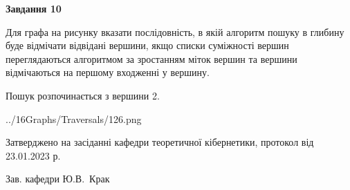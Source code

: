 \documentclass[12pt, ukrainian]{article}
\begin{document}
{\begin {large}
{\begin {center}\textbf{Завдання 10}\end {center}}\par
Для графа на рисунку вказати послідовність, в якій алгоритм пошуку в глибину буде відмічати відвідані вершини, якщо списки суміжності вершин переглядаються алгоритмом за зростанням міток вершин та вершини відмічаються на першому вход\-женні у вершину.\par
Пошук розпочинається з вершини 2.\par

\begin{center}
	{../16Graphs/Traversals/126.png}
\end{center}\par
\newpage


\end {large}
}
{\smallskip \begin {small} Затверджено на засіданні кафедри теоретичної кібернетики, протокол  від   23.01.2023 р.\par\smallskip\smallskip
{\parbox {6.5 cm}{Зав. кафедри \dotfill Ю.В.~Крак}} \end{small}}
\end{document}
